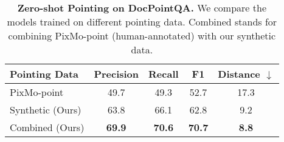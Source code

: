 \begin{table}[H]
    \small
    \centering
    \setlength{\tabcolsep}{4pt}
    \begin{tabular}{lcccc}
        \toprule
        \textbf{Pointing Data} & \textbf{Precision} & \textbf{Recall} & \textbf{F1} &   \textbf{Distance $\downarrow$} \\
        \midrule
        PixMo-point & 49.7 & 49.3 & 52.7 & 17.3 \\ \midrule
        Synthetic (Ours) & 63.8 & 66.1 & 62.8 & 9.2 \\
        Combined (Ours) & \textbf{69.9} & \textbf{70.6} & \textbf{70.7} & \textbf{8.8} \\
        \bottomrule
    \end{tabular}
    \vspace{-.1cm}
    \caption{\textbf{Zero-shot Pointing on DocPointQA.} We compare the models trained on different pointing data. Combined stands for combining PixMo-point (human-annotated) \cite{deitke2024molmo} with our synthetic data.}
    \label{tab:doc_point}
\end{table}